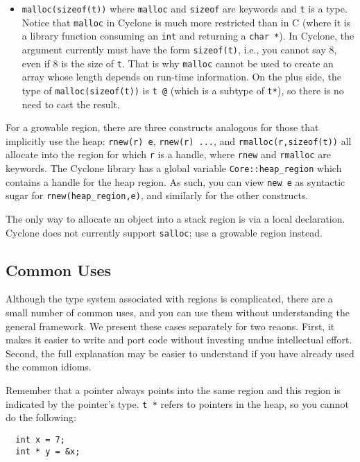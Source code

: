 \begin{itemize}
\item \texttt{malloc(sizeof(t))} where \texttt{malloc} and \texttt{sizeof}
  are keywords and \texttt{t} is a type.  Notice that \texttt{malloc} in
  Cyclone is much more restricted than in C (where it is a library
  function consuming an \texttt{int} and returning a \texttt{char *}).  In
  Cyclone, the argument currently must have the form \texttt{sizeof(t)},
  i.e., you cannot say 8, even if 8 is the size of \texttt{t}.  That is
  why \texttt{malloc} cannot be used to create an array whose length
  depends on run-time information.  On the plus side, the type of
  \texttt{malloc(sizeof(t))} is \texttt{t @} (which is a subtype of
  \texttt{t*}), so there is no need to cast the result.
\end{itemize}

For a growable region, there are three constructs analogous for those
that implicitly use the heap: \texttt{rnew(r) e}, \texttt{rnew(r) {...}},
and \texttt{rmalloc(r,sizeof(t))} all allocate into the region for which
\texttt{r} is a handle, where \texttt{rnew} and \texttt{rmalloc} are
keywords.  The Cyclone library has a global variable
\texttt{Core::heap_region} which contains a handle for the heap region.
As such, you can view \texttt{new e} as syntactic sugar for
\texttt{rnew(heap_region,e)}, and similarly for the other constructs.

The only way to allocate an object into a stack region is via a local
declaration.  Cyclone does not currently support \texttt{salloc}; use a
growable region instead.

\subsection{Common Uses}
Although the type system associated with regions is complicated, there
are a small number of common uses, and you can use them without
understanding the general framework.  We present these cases
separately for two reaons.  First, it makes it easier to write and
port code without investing undue intellectual effort.  Second, the
full explanation may be easier to understand if you have already used
the common idioms.

Remember that a pointer always points into the same region and this
region is indicated by the pointer's type. \texttt{t *} refers to pointers in
the heap, so you cannot do the following:
\begin{verbatim}
  int x = 7;
  int * y = &x;
\end{verbatim}

